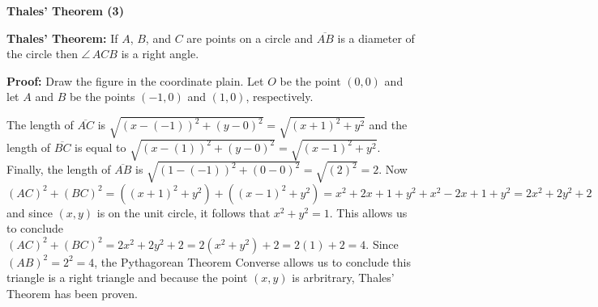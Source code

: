 \documentclass[12pt]{article}
\begin{document}
\begin{center}
\Large{\textbf{Thales' Theorem (3)}}
\end{center}
\textbf{Thales' Theorem:} If $A$, $B$, and $C$ are points on a circle and
$\overline{AB}$ is a diameter of the circle then $\angle \,ACB$ is a right angle.\\

\begin{center}
\end{center}

\noindent\textbf{Proof:} Draw the figure in the coordinate plain. Let $O$ be the point $(0,0)$
and let $A$ and $B$ be the points $(-1,0)$ and $(1,0)$, respectively.

\begin{center}
\end{center}

The length of $\overline{AC}$ is $\sqrt{(x-(-1))^2 + (y-0)^2}=\sqrt{(x+1)^2 + y^2}$ and the 
length of $\overline{BC}$ is equal to $\sqrt{(x-(1))^2 + (y-0)^2}=\sqrt{(x-1)^2 + y^2}$. 
Finally, the length of $\overline{AB}$ is $\sqrt{(1-(-1))^2 + (0-0)^2}=\sqrt{(2)^2}=2$. Now
$(AC)^2 + (BC)^2 = \left((x+1)^2 + y^2\right) + \left((x-1)^2 + y^2\right) = x^2+2x+1+y^2 +
x^2-2x+1+y^2=2x^2+2y^2+2$ and since $(x,y)$ is on the unit circle, it follows that
$x^2+y^2=1$. This allows us to conclude $(AC)^2 + (BC)^2 = 2x^2+2y^2+2=2(x^2+y^2)+2=2(1)+2=4$.
Since  $(AB)^2=2^2=4$, the Pythagorean Theorem Converse allows us to conclude this triangle is
a right triangle and because the point $(x,y)$ is arbritrary, Thales' Theorem has been proven.
\end{document}
